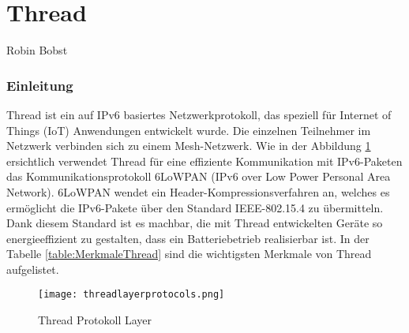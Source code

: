 \vspace*{4cm}
\part{Thread}\label{part:Thread}
Robin Bobst
\vspace*{\fill}
\clearpage

\section{Einleitung}\label{sec:EinleitungThread}
Thread ist ein auf IPv6 basiertes Netzwerkprotokoll, das speziell für Internet of Things (IoT) Anwendungen entwickelt wurde. Die einzelnen Teilnehmer im Netzwerk verbinden sich zu einem Mesh-Netzwerk. Wie in der Abbildung \ref{fig:ThreadProtokollLayer} ersichtlich verwendet Thread für eine effiziente Kommunikation mit IPv6-Paketen das Kommunikationsprotokoll 6LoWPAN (IPv6 over Low Power Personal Area Network). 6LoWPAN wendet ein Header-Kompressionsverfahren an, welches es ermöglicht die IPv6-Pakete über den Standard IEEE-802.15.4 zu übermitteln. Dank diesem Standard ist es machbar, die mit Thread entwickelten Geräte so energieeffizient zu gestalten, dass ein Batteriebetrieb realisierbar ist. In der Tabelle \ref{table:MerkmaleThread} sind die wichtigsten Merkmale von Thread aufgelistet. \\

\begin{figure}[H]
	\centering
	\texttt{[image: threadlayerprotocols.png]}
	\caption{Thread Protokoll Layer \cite{erickson_picture_2019}}
	\label{fig:ThreadProtokollLayer}
\end{figure}

